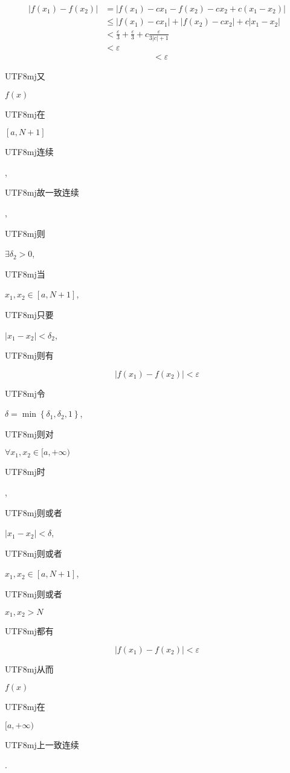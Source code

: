 \documentclass[10pt]{article}
\begin{document}
$$
\begin{aligned}
\left|f\left(x_{1}\right)-f\left(x_{2}\right)\right| &=\left|f\left(x_{1}\right)-c x_{1}-f\left(x_{2}\right)-c x_{2}+c\left(x_{1}-x_{2}\right)\right| \\
& \leq\left|f\left(x_{1}\right)-c x_{1}\right|+\left|f\left(x_{2}\right)-c x_{2}\right|+c\left|x_{1}-x_{2}\right| \\
&<\frac{\varepsilon}{3}+\frac{\varepsilon}{3}+c \frac{\varepsilon}{3|c|+1} \\
&<\varepsilon
\end{aligned}
$$
$$
\begin{aligned}
& <\varepsilon
\end{aligned}
$$
\begin{CJK}{UTF8}{mj}又\end{CJK} $f(x)$ \begin{CJK}{UTF8}{mj}在\end{CJK} $[a, N+1]$ \begin{CJK}{UTF8}{mj}连续\end{CJK}, \begin{CJK}{UTF8}{mj}故一致连续\end{CJK}, \begin{CJK}{UTF8}{mj}则\end{CJK} $\exists \delta_{2}>0$, \begin{CJK}{UTF8}{mj}当\end{CJK} $x_{1}, x_{2} \in[a, N+1]$, \begin{CJK}{UTF8}{mj}只要\end{CJK} $\left|x_{1}-x_{2}\right|<\delta_{2}$, \begin{CJK}{UTF8}{mj}则有\end{CJK}
$$
\left|f\left(x_{1}\right)-f\left(x_{2}\right)\right|<\varepsilon
$$
\begin{CJK}{UTF8}{mj}令\end{CJK} $\delta=\min \left\{\delta_{1}, \delta_{2}, 1\right\}$, \begin{CJK}{UTF8}{mj}则对\end{CJK} $\forall x_{1}, x_{2} \in[a,+\infty)$ \begin{CJK}{UTF8}{mj}时\end{CJK}, \begin{CJK}{UTF8}{mj}则或者\end{CJK} $\left|x_{1}-x_{2}\right|<\delta$, \begin{CJK}{UTF8}{mj}则或者\end{CJK} $x_{1}, x_{2} \in[a, N+1]$, \begin{CJK}{UTF8}{mj}则或者\end{CJK} $x_{1}, x_{2}>N$ \begin{CJK}{UTF8}{mj}都有\end{CJK}
$$
\left|f\left(x_{1}\right)-f\left(x_{2}\right)\right|<\varepsilon
$$
\begin{CJK}{UTF8}{mj}从而\end{CJK} $f(x)$ \begin{CJK}{UTF8}{mj}在\end{CJK} $[a,+\infty)$ \begin{CJK}{UTF8}{mj}上一致连续\end{CJK}.
\end{document}
